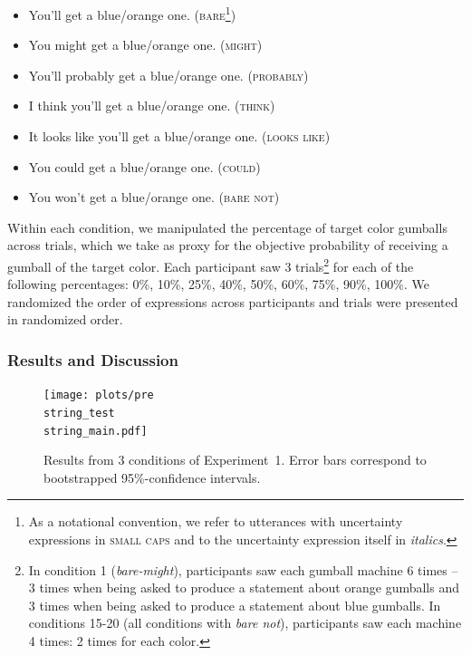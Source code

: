 \documentclass[man, floatsintext]{apa6}
\begin{document}
 \begin{itemize}
\item You'll get a blue/orange one. (\textsc{bare}\footnote{As a notational convention, we refer to utterances with uncertainty expressions in \textsc{small caps} and to the uncertainty expression itself in \textit{italics}. })
\item You might get a blue/orange one. (\textsc{might})
\item You'll probably get a blue/orange one. (\textsc{probably})
\item I think you'll get a blue/orange one. (\textsc{think})
\item It looks like you'll get a blue/orange one. (\textsc{looks like})
\item You could get a blue/orange one. (\textsc{could})
\item You won't get a blue/orange one. (\textsc{bare not})
\end{itemize}


\noindent Within each condition, we manipulated the percentage of target color gumballs across trials, which we take as proxy for the objective probability of receiving a gumball of the target color. 
Each participant saw 3 trials\footnote{In condition 1 (\textit{bare-might}), participants saw each gumball machine 6 times -- 3 times when being asked to produce a statement about orange gumballs and 3 times when being asked to produce a statement about blue gumballs. In conditions 15-20 (all conditions with \textit{bare not}), participants saw each machine 4 times: 2 times for each color.} 
for each of the following percentages: 0\%, 10\%, 25\%, 40\%, 50\%, 60\%, 75\%, 90\%, 100\%. We randomized the order of expressions across participants and trials were presented in randomized order.

\subsubsection{Results and Discussion}

\begin{figure}
\texttt{[image: plots/pre\\string\_test\\string\_main.pdf]} 
\caption{Results from 3 conditions of Experiment~1. Error bars correspond to bootstrapped 95\%-confidence intervals. \label{fig:norming-results-main} }
\end{figure}
\end{document}
